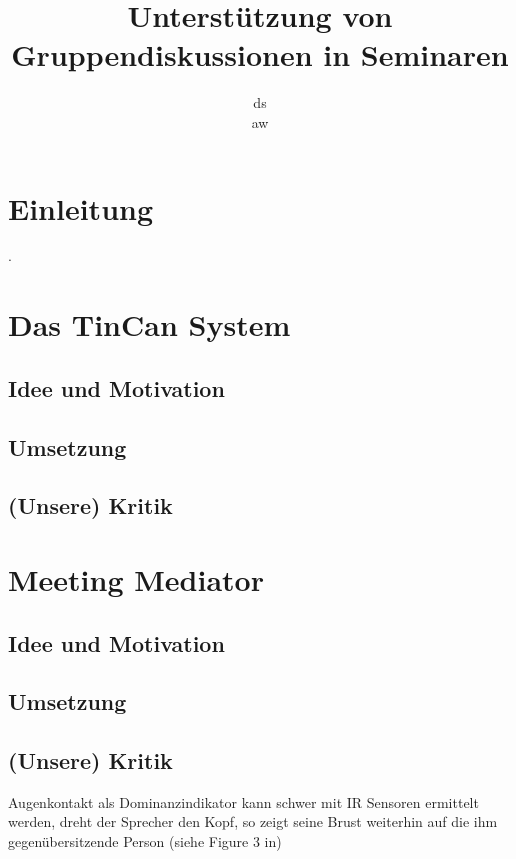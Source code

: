 \documentclass{seminarvorlage}
\begin{document}
\title{Unterstützung von Gruppendiskussionen in Seminaren}
\author{
  \alignauthor ds\\
  \alignauthor aw\\
}

\maketitle


\section{Einleitung}
.
\section{Das TinCan System}
\subsection{Idee und Motivation}

\subsection{Umsetzung}
\subsection{(Unsere) Kritik}

\section{Meeting Mediator}
\subsection{Idee und Motivation}
\subsection{Umsetzung}
\subsection{(Unsere) Kritik}
Augenkontakt als Dominanzindikator kann schwer mit IR Sensoren ermittelt werden,
dreht der Sprecher den Kopf, so zeigt seine Brust weiterhin auf die ihm 
gegenübersitzende Person (siehe Figure 3 in)
\end{document}
